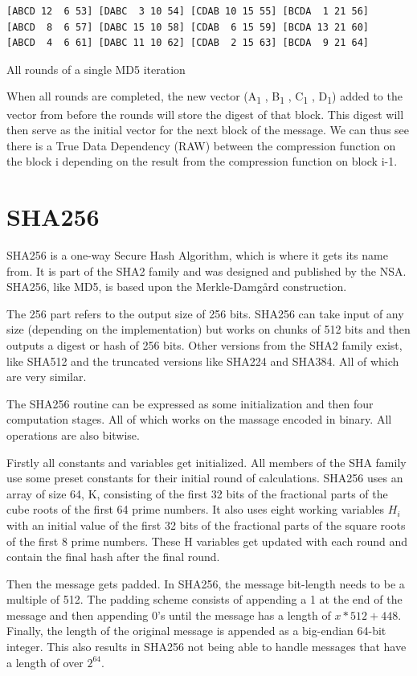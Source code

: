 \documentclass[a4paper, openany]{book}
\begin{document}
\begin{abstact}
\begin{table}[H]
\begin{BVerbatim}[fontsize=\tiny]
[ABCD 12  6 53] [DABC  3 10 54] [CDAB 10 15 55] [BCDA  1 21 56]
[ABCD  8  6 57] [DABC 15 10 58] [CDAB  6 15 59] [BCDA 13 21 60]
[ABCD  4  6 61] [DABC 11 10 62] [CDAB  2 15 63] [BCDA  9 21 64]
\end{BVerbatim}
\caption{All rounds of a single MD5 iteration}
\label{fig:MD5Rounds}
\end{table}
When all rounds are completed, the new vector (A\textsubscript{1} , B\textsubscript{1} , C\textsubscript{1} , D\textsubscript{1}) added to the vector from before the rounds will store the digest of that block. This digest will then serve as the initial vector for the next block of the message. We can thus see there is a True Data Dependency (RAW) between the compression function on the block i depending on the result from the compression function on block i-1.
\section{SHA256}
\label{sec:orgaa3b3d4}
SHA256 is a one-way Secure Hash Algorithm, which is where it gets its name from.
It is part of the SHA2 family and was designed and published by the NSA.
SHA256, like MD5, is based upon the Merkle-Damgård construction.

The 256 part refers to the output size of 256 bits.
SHA256 can take input of any size (depending on the implementation) but works
on chunks of 512 bits and then outputs a digest or hash of 256 bits.
Other versions from the SHA2 family exist, like SHA512 and the truncated
versions like SHA224 and SHA384. All of which are very similar.

The SHA256 routine can be expressed as some initialization and then four computation stages.
All of which works on the massage encoded in binary. All operations are also bitwise.

Firstly all constants and variables get initialized. All members of the SHA family use some preset constants for their initial round of calculations.
SHA256 uses an array of size 64, K, consisting of the first 32 bits of the fractional parts of the cube roots of the first 64 prime numbers.
It also uses eight working variables \(H_i\) with an initial value of the first 32 bits of the fractional parts of the square roots of the first 8 prime numbers.
These H variables get updated with each round and contain the final hash after the final round.

Then the message gets padded. In SHA256, the message bit-length needs to be a multiple of 512.
The padding scheme consists of appending a 1 at the end of the message and then appending 0's until the message has a length of \(x*512+448\).
Finally, the length of the original message is appended as a big-endian 64-bit integer.
This also results in SHA256 not being able to handle messages that have a length of over \(2^{64}\).


\end{abstact}
\end{document}
